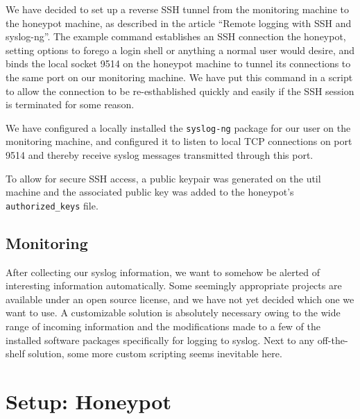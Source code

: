 \documentclass[11pt]{article} %
\begin{document}
We have decided to set up a reverse SSH tunnel from the monitoring machine to the honeypot machine, as described in the article ``Remote logging with SSH and syslog-ng''. \cite{remote_logging}
The example command establishes an SSH connection the honeypot, setting options to forego a login shell or anything a normal user would desire, and binds the local socket 9514 on the honeypot machine to tunnel its connections to the same port on our monitoring machine.
We have put this command in a script to allow the connection to be re-esthablished quickly and easily if the SSH session is terminated for some reason. 

We have configured a locally installed the \verb|syslog-ng| package for our user on the monitoring machine, and configured it to listen to local TCP connections on port 9514 and thereby receive syslog messages transmitted through this port.

To allow for secure SSH access, a public keypair was generated on the util machine and the associated public key was added to the honeypot's \verb|authorized_keys| file.

\subsection{Monitoring}
After collecting our syslog information, we want to somehow be alerted of interesting information automatically.
Some seemingly appropriate projects are available under an open source license, and we have not yet decided which one we want to use.
A customizable solution is absolutely necessary owing to the wide range of incoming information and the modifications made to a few of the installed software packages specifically for logging to syslog.
Next to any off-the-shelf solution, some more custom scripting seems inevitable here.



\section{Setup: Honeypot}
\end{document}

